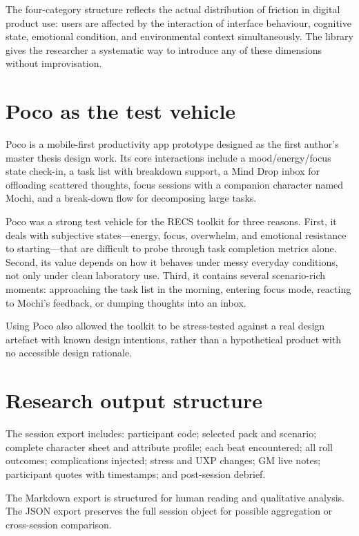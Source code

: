 \documentclass[12pt,a4paper]{report}
\begin{document}
The four-category structure reflects the actual distribution of friction in digital
product use: users are affected by the interaction of interface behaviour, cognitive
state, emotional condition, and environmental context simultaneously.
The library gives the researcher a systematic way to introduce any of these dimensions
without improvisation.

\section{Poco as the test vehicle}

Poco is a mobile-first productivity app prototype designed as the first author's master
thesis design work.
Its core interactions include a mood/energy/focus state check-in, a task list with
breakdown support, a Mind Drop inbox for offloading scattered thoughts, focus sessions
with a companion character named Mochi, and a break-down flow for decomposing large
tasks.

Poco was a strong test vehicle for the RECS toolkit for three reasons.
First, it deals with subjective states---energy, focus, overwhelm, and emotional
resistance to starting---that are difficult to probe through task completion metrics
alone.
Second, its value depends on how it behaves under messy everyday conditions, not only
under clean laboratory use.
Third, it contains several scenario-rich moments: approaching the task list in the
morning, entering focus mode, reacting to Mochi's feedback, or dumping thoughts into an
inbox.

Using Poco also allowed the toolkit to be stress-tested against a real design artefact
with known design intentions, rather than a hypothetical product with no accessible
design rationale.

\section{Research output structure}

The session export includes: participant code; selected pack and scenario; complete
character sheet and attribute profile; each beat encountered; all roll outcomes;
complications injected; stress and UXP changes; GM live notes; participant quotes with
timestamps; and post-session debrief.

The Markdown export is structured for human reading and qualitative analysis.
The JSON export preserves the full session object for possible aggregation or
cross-session comparison.
\end{document}

